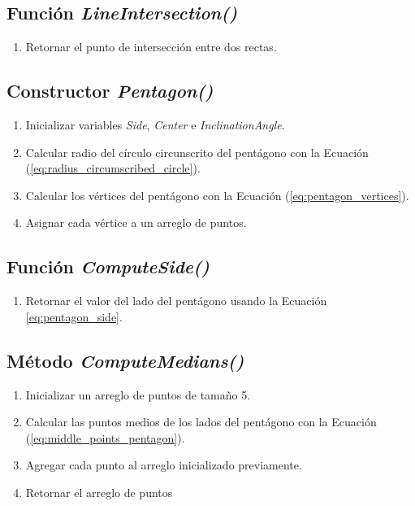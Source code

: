 \documentclass[oneside, a4paper]{article}
\begin{document}
        \subsection{Función \textit{LineIntersection()}}
            
            \begin{enumerate}
                \item Retornar el punto de intersección entre dos rectas.
            \end{enumerate}

        \subsection{Constructor \textit{Pentagon()}}
            
            \begin{enumerate}
                \item Inicializar variables \textit{Side}, \textit{Center} e \textit{InclinationAngle}.
                \item Calcular radio del círculo circunscrito del pentágono con la Ecuación (\ref{eq:radius_circumscribed_circle}).
                \item Calcular los vértices del pentágono con la Ecuación (\ref{eq:pentagon_vertices}).
                \item Asignar cada vértice a un arreglo de puntos.
            \end{enumerate}

        \subsection{Función \textit{ComputeSide()}}

            \begin{enumerate}
                \item Retornar el valor del lado del pentágono usando la Ecuación \ref{eq:pentagon_side}.
            \end{enumerate}

        \subsection{Método \textit{ComputeMedians()}}

            \begin{enumerate}
                \item Inicializar un arreglo de puntos de tamaño 5.
                \item Calcular las puntos medios de los lados del pentágono con la Ecuación (\ref{eq:middle_points_pentagon}).
                \item Agregar cada punto al arreglo inicializado previamente.
                \item Retornar el arreglo de puntos
            \end{enumerate}
\end{document}
